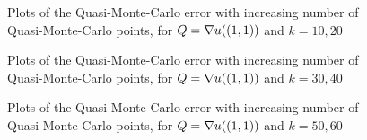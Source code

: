 \begin{figure}[h]
    \centering
  \begin{subfigure}{0.45\textwidth}

  \end{subfigure}
    \begin{subfigure}{0.45\textwidth}

    \end{subfigure}
\caption{Plots of the Quasi-Monte-Carlo error with increasing number of Quasi-Monte-Carlo points, for $Q=\nabla u((1,1))$ and $k=10,20$ \label{fig:qmcgradient_top_right1020}}
\end{figure}
\begin{figure}[h]
    \centering
  \begin{subfigure}{0.45\textwidth}

  \end{subfigure}
    \begin{subfigure}{0.45\textwidth}

    \end{subfigure}
\caption{Plots of the Quasi-Monte-Carlo error with increasing number of Quasi-Monte-Carlo points, for $Q=\nabla u((1,1))$ and $k=30,40$ \label{fig:qmcgradient_top_right3040}}
\end{figure}
\begin{figure}[h]
    \centering
  \begin{subfigure}{0.45\textwidth}

  \end{subfigure}
    \begin{subfigure}{0.45\textwidth}

    \end{subfigure}
\caption{Plots of the Quasi-Monte-Carlo error with increasing number of Quasi-Monte-Carlo points, for $Q=\nabla u((1,1))$ and $k=50,60$ \label{fig:qmcgradient_top_right5060}}
\end{figure}


